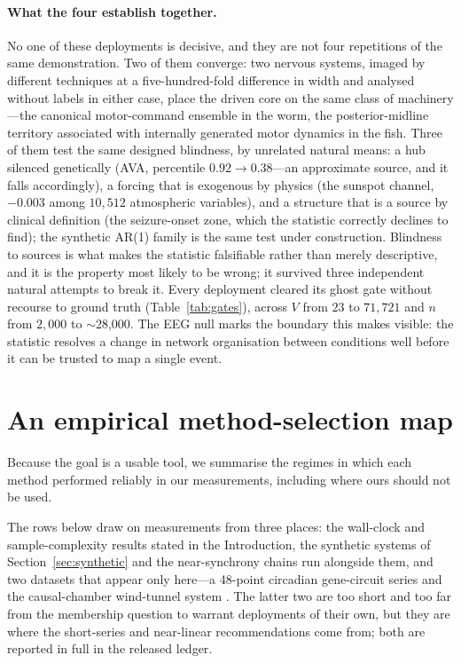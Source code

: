 \documentclass[11pt]{article}
\begin{document}
\paragraph{What the four establish together.} No one of these deployments is decisive, and they are not four repetitions of the same demonstration. Two of them converge: two nervous systems, imaged by different techniques at a five-hundred-fold difference in width and analysed without labels in either case, place the driven core on the same class of machinery---the canonical motor-command ensemble in the worm, the posterior-midline territory associated with internally generated motor dynamics in the fish. Three of them test the same designed blindness, by unrelated natural means: a hub silenced genetically (AVA, percentile $0.92\!\to\!0.38$---an approximate source, and it falls accordingly), a forcing that is exogenous by physics (the sunspot channel, $-0.003$ among $10{,}512$ atmospheric variables), and a structure that is a source by clinical definition (the seizure-onset zone, which the statistic correctly declines to find); the synthetic AR(1) family is the same test under construction. Blindness to sources is what makes the statistic falsifiable rather than merely descriptive, and it is the property most likely to be wrong; it survived three independent natural attempts to break it. Every deployment cleared its ghost gate without recourse to ground truth (Table~\ref{tab:gates}), across $V$ from $23$ to $71{,}721$ and $n$ from $2{,}000$ to $\sim$28{,}000. The EEG null marks the boundary this makes visible: the statistic resolves a change in network organisation between conditions well before it can be trusted to map a single event.

\section{An empirical method-selection map}
\label{sec:map}

Because the goal is a usable tool, we summarise the regimes in which
each method performed reliably in our measurements, including where ours
should not be used.

The rows below draw on measurements from three places: the wall-clock and sample-complexity results stated in the Introduction, the synthetic systems of Section~\ref{sec:synthetic} and the near-synchrony chains run alongside them, and two datasets that appear only here---a 48-point circadian gene-circuit series \citep{hughes2009} and the causal-chamber wind-tunnel system \citep{gamella2025}. The latter two are too short and too far from the membership question to warrant deployments of their own, but they are where the short-series and near-linear recommendations come from; both are reported in full in the released ledger.
\end{document}
